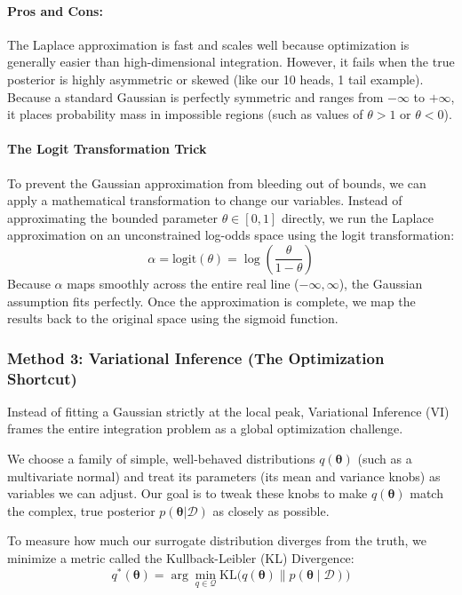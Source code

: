 \documentclass{article}
\begin{document}
\paragraph{Pros and Cons:}
The Laplace approximation is fast and scales well because optimization is generally easier than high-dimensional integration. However, it fails when the true posterior is highly asymmetric or skewed (like our 10 heads, 1 tail example). Because a standard Gaussian is perfectly symmetric and ranges from $-\infty$ to $+\infty$, it places probability mass in impossible regions (such as values of $\theta > 1$ or $\theta < 0$). 

\paragraph{The Logit Transformation Trick}
To prevent the Gaussian approximation from bleeding out of bounds, we can apply a mathematical transformation to change our variables. Instead of approximating the bounded parameter $\theta \in [0, 1]$ directly, we run the Laplace approximation on an unconstrained log-odds space using the logit transformation:
\begin{equation}
\alpha = \text{logit}(\theta) = \log\left(\frac{\theta}{1-\theta}\right)
\end{equation}
Because $\alpha$ maps smoothly across the entire real line ($-\infty, \infty$), the Gaussian assumption fits perfectly. Once the approximation is complete, we map the results back to the original space using the sigmoid function.

\subsubsection{Method 3: Variational Inference (The Optimization Shortcut)}
Instead of fitting a Gaussian strictly at the local peak, Variational Inference (VI) frames the entire integration problem as a global optimization challenge. 

We choose a family of simple, well-behaved distributions $q(\boldsymbol{\theta})$ (such as a multivariate normal) and treat its parameters (its mean and variance knobs) as variables we can adjust. Our goal is to tweak these knobs to make $q(\boldsymbol{\theta})$ match the complex, true posterior $p(\boldsymbol{\theta}|\mathcal{D})$ as closely as possible.

To measure how much our surrogate distribution diverges from the truth, we minimize a metric called the Kullback-Leibler (KL) Divergence:
\begin{equation}
q^*(\boldsymbol{\theta}) = \arg\min_{q \in \mathcal{Q}} \text{KL}\big(q(\boldsymbol{\theta}) \parallel p(\boldsymbol{\theta}\mid\mathcal{D})\big)
\end{equation}
\end{document}

